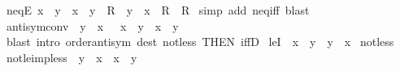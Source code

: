 \begin{isabellebody}
\endisatagproof
{\isafoldproof}%
%
\isadelimproof
\isanewline
%
\endisadelimproof
\isanewline
{}\isamarkupfalse%
\ neqE{\isacharcolon}{\kern0pt}\ {\isachardoublequoteopen}x\ {\isasymnoteq}\ y\ {\isasymLongrightarrow}\ {\isacharparenleft}{\kern0pt}x\ {\isacharless}{\kern0pt}\ y\ {\isasymLongrightarrow}\ R{\isacharparenright}{\kern0pt}\ {\isasymLongrightarrow}\ {\isacharparenleft}{\kern0pt}y\ {\isacharless}{\kern0pt}\ x\ {\isasymLongrightarrow}\ R{\isacharparenright}{\kern0pt}\ {\isasymLongrightarrow}\ R{\isachardoublequoteclose}\isanewline
%
\isadelimproof
%
\endisadelimproof
%
\isatagproof
{}\isamarkupfalse%
\ {\isacharparenleft}{\kern0pt}simp\ add{\isacharcolon}{\kern0pt}\ neq{\isacharunderscore}{\kern0pt}iff{\isacharparenright}{\kern0pt}\ blast%
\endisatagproof
{\isafoldproof}%
%
\isadelimproof
\isanewline
%
\endisadelimproof
\isanewline
{}\isamarkupfalse%
\ antisym{\isacharunderscore}{\kern0pt}conv{}{\isacharcolon}{\kern0pt}\ {\isachardoublequoteopen}{\isasymnot}\ y\ {\isacharless}{\kern0pt}\ x\ {\isasymLongrightarrow}\ {\isasymnot}\ x\ {\isacharless}{\kern0pt}\ y\ {\isasymlongleftrightarrow}\ x\ {\isacharequal}{\kern0pt}\ y{\isachardoublequoteclose}\isanewline
%
\isadelimproof
%
\endisadelimproof
%
\isatagproof
{}\isamarkupfalse%
\ {\isacharparenleft}{\kern0pt}blast\ intro{\isacharcolon}{\kern0pt}\ order{\isachardot}{\kern0pt}antisym\ dest{\isacharcolon}{\kern0pt}\ not{\isacharunderscore}{\kern0pt}less\ {\isacharbrackleft}{\kern0pt}THEN\ iffD{}{\isacharbrackright}{\kern0pt}{\isacharparenright}{\kern0pt}%
\endisatagproof
{\isafoldproof}%
%
\isadelimproof
\isanewline
%
\endisadelimproof
\isanewline
{}\isamarkupfalse%
\ leI{\isacharcolon}{\kern0pt}\ {\isachardoublequoteopen}{\isasymnot}\ x\ {\isacharless}{\kern0pt}\ y\ {\isasymLongrightarrow}\ y\ {\isasymle}\ x{\isachardoublequoteclose}\isanewline
%
\isadelimproof
%
\endisadelimproof
%
\isatagproof
{}\isamarkupfalse%
\ not{\isacharunderscore}{\kern0pt}less\ \isacommand{{\isachardot}{\kern0pt}}\isamarkupfalse%
%
\endisatagproof
{\isafoldproof}%
%
\isadelimproof
\isanewline
%
\endisadelimproof
\isanewline
{}\isamarkupfalse%
\ not{\isacharunderscore}{\kern0pt}le{\isacharunderscore}{\kern0pt}imp{\isacharunderscore}{\kern0pt}less{\isacharcolon}{\kern0pt}\ {\isachardoublequoteopen}{\isasymnot}\ y\ {\isasymle}\ x\ {\isasymLongrightarrow}\ x\ {\isacharless}{\kern0pt}\ y{\isachardoublequoteclose}\isanewline
%
\isadelimproof
%
\endisadelimproof
%
\isatagproof
{}\isamarkupfalse%

\end{isabellebody}
